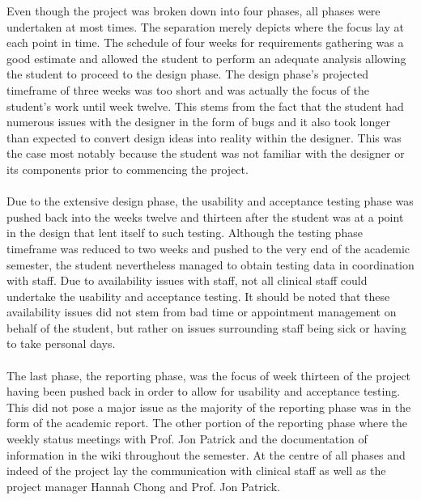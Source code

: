 \noindent Even though the project was broken down into four phases, all phases were undertaken at most times. The separation merely depicts where the focus lay at each point in time. The schedule of four weeks for requirements gathering was a good estimate and allowed the student to perform an adequate analysis allowing the student to proceed to the design phase. The design phase's projected timeframe of three weeks was too short and was actually the focus of the student's work until week twelve. This stems from the fact that the student had numerous issues with the designer in the form of bugs and it also took longer than expected to convert design ideas into reality within the designer. This was the case most notably because the student was not familiar with the designer or its components prior to commencing the project.
\\ \\
Due to the extensive design phase, the usability and acceptance testing phase was pushed back into the weeks twelve and thirteen after the student was at a point in the design that lent itself to such testing. Although the testing phase timeframe was reduced to two weeks and pushed to the very end of the academic semester, the student nevertheless managed to obtain testing data in coordination with staff. Due to availability issues with staff, not all clinical staff could undertake the usability and acceptance testing. It should be noted that these availability issues did not stem from bad time or appointment management on behalf of the student, but rather on issues surrounding staff being sick or having to take personal days. 
\\ \\
The last phase, the reporting phase, was the focus of week thirteen of the project having been pushed back in order to allow for usability and acceptance testing. This did not pose a major issue as the majority of the reporting phase was in the form of the academic report. The other portion of the reporting phase where the weekly status meetings with Prof. Jon Patrick and the documentation of information in the wiki throughout the semester. At the centre of all phases and indeed of the project lay the communication with clinical staff as well as the project manager Hannah Chong and Prof. Jon Patrick.
